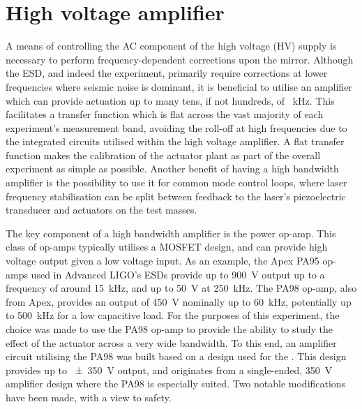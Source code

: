 \section{\label{sec:hv-amplifier}High voltage amplifier}

A means of controlling the \gls{AC} component of the high voltage (\gls{HV}) supply is necessary to perform frequency-dependent corrections upon the mirror. Although the \gls{ESD}, and indeed the \SSM{} experiment, primarily require corrections at lower frequencies where seismic noise is dominant, it is beneficial to utilise an amplifier which can provide actuation up to many tens, if not hundreds, of \SI{}{\kilo\hertz}. This facilitates a transfer function which is flat across the vast majority of each experiment's measurement band, avoiding the roll-off at high frequencies due to the integrated circuits utilised within the high voltage amplifier. A flat transfer function makes the calibration of the actuator plant as part of the overall experiment as simple as possible. Another benefit of having a high bandwidth amplifier is the possibility to use it for common mode control loops, where laser frequency stabilisation can be split between feedback to the laser's piezoelectric transducer and actuators on the test masses.

The key component of a high bandwidth amplifier is the power op-amp. This class of op-amps typically utilises a \gls{MOSFET} design, and can provide high voltage output given a low voltage input. As an example, the Apex PA95 op-amps used in Advanced LIGO's \gls{ESD}s provide up to \SI{900}{\volt} output up to a frequency of around \SI{15}{\kilo\hertz}, and up to \SI{50}{\volt} at \SI{250}{\kilo\hertz}. The PA98 op-amp, also from Apex, provides an output of \SI{450}{\volt} nominally up to \SI{60}{\kilo\hertz}, potentially up to \SI{500}{\kilo\hertz} for a low capacitive load. For the purposes of this experiment, the choice was made to use the PA98 op-amp to provide the ability to study the effect of the actuator across a very wide bandwidth. To this end, an amplifier circuit utilising the PA98 was built based on a design used for the \AEIPROTOTYPE{}. This design provides up to \SI{\pm350}{\volt} output, and originates from a single-ended, \SI{350}{\volt} amplifier design where the PA98 is especially suited. Two notable modifications have been made, with a view to safety.


